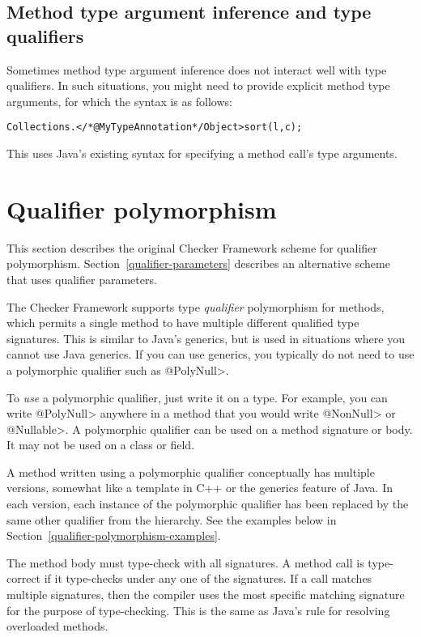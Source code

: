 \subsection{Method type argument inference and type qualifiers\label{infer-method-type-qualifiers}}

Sometimes method type argument inference does not interact well with
type qualifiers. In such situations, you might need to provide
explicit method type arguments, for which the syntax is as follows:

\begin{alltt}
	Collections.</*@MyTypeAnnotation*/ Object>sort(l, c);
\end{alltt}

\noindent
This uses Java's existing syntax for specifying a method call's type arguments.



\section{Qualifier polymorphism\label{qualifier-polymorphism}}

This section describes the original Checker Framework scheme for qualifier
polymorphism.  Section~\ref{qualifier-parameters} describes an alternative
scheme that uses qualifier parameters.

The Checker Framework supports type \emph{qualifier} polymorphism for
methods, which permits a single method to have multiple different qualified
type signatures.  This is similar to Java's generics, but is used in
situations where you cannot use Java generics.  If you can use generics,
you typically do not need to use a polymorphic qualifier such as \<@PolyNull>.

To \emph{use} a polymorphic qualifier, just write it on a type.
For example, you can write \<@PolyNull> anywhere in a method that you would write
\<@NonNull> or \<@Nullable>.
A polymorphic qualifier can be used on a method signature or body.
It may not be used on a class or field.

A method written using a polymorphic qualifier conceptually has multiple
versions, somewhat like a template in C++ or the generics feature of Java.
In each version, each instance of the polymorphic qualifier has been
replaced by the same other qualifier from the hierarchy.  See the examples
below in Section~\ref{qualifier-polymorphism-examples}.

The method body must type-check with all signatures.  A method call is
type-correct if it type-checks under any one of the signatures.  If a call
matches multiple signatures, then the compiler uses the most specific
matching signature for the purpose of type-checking.  This is the same as
Java's rule for resolving overloaded methods.

